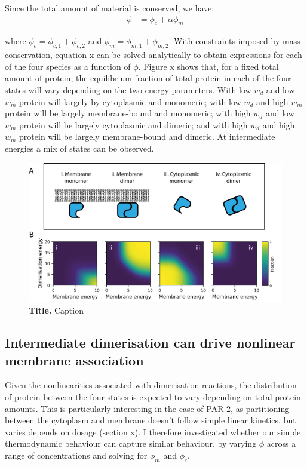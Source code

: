 \documentclass[12pt]{"article"}
\newcommand{\mycaption}[2]{\caption[#1]{\textbf{#1.} #2}}
\begin{document}
Since the total amount of material is conserved, we have:
\begin{align}
\phi &= \phi_c + \alpha\phi_m
\end{align}

where $\phi_c = \phi_{c,1} + \phi_{c,2}$ and $\phi_m = \phi_{m,1} + \phi_{m,2}$. With constraints imposed by mass conservation, equation x can be solved analytically to obtain expressions for each of the four species as a function of $\phi$. Figure x shows that, for a fixed total amount of protein, the equilibrium fraction of total protein in each of the four states will vary depending on the two energy parameters. With low $w_d$ and low $w_m$ protein will largely by cytoplasmic and monomeric; with low $w_d$ and high $w_m$ protein will be largely membrane-bound and monomeric; with high $w_d$ and low $w_m$ protein will be largely cytoplasmic and dimeric; and with high $w_d$ and high $w_m$ protein will be largely membrane-bound and dimeric. At intermediate energies a mix of states can be observed.\\

\begin{figure}[!h]
\includegraphics[scale=0.9]{thermodynamic_model_species}
\setlength{\abovecaptionskip}{20pt}
\centering
\mycaption{Title}{Caption}
\label{fig:thermodynamic_model_species}
\end{figure}


\subsection{Intermediate dimerisation can drive nonlinear membrane association}

Given the nonlinearities associated with dimerisation reactions, the distribution of protein between the four states is expected to vary depending on total protein amounts. This is particularly interesting in the case of PAR-2, as partitioning between the cytoplasm and membrane doesn’t follow simple linear kinetics, but varies depends on dosage (section x). I therefore investigated whether our simple thermodynamic behaviour can capture similar behaviour, by varying $\phi$ across a range of concentrations and solving for $\phi_m$ and $\phi_c$. \\
\end{document}
